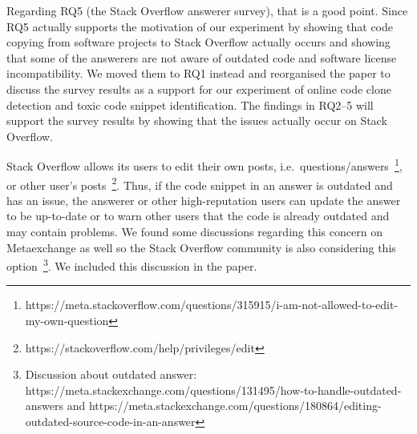 \documentclass[a4paper,twoside,10pt]{reviewresponse}
\begin{document}
Regarding RQ5 (the Stack Overflow answerer survey), that is a good point. Since RQ5 actually supports the motivation of our experiment by showing that code copying from software projects to Stack Overflow actually occurs and showing that some of the answerers are not aware of outdated code and software license incompatibility. We moved them to RQ1 instead and reorganised the paper to discuss the survey results as a support for our experiment of online code clone detection and toxic code snippet identification. The findings in RQ2--5 will support the survey results by showing that the issues actually occur on Stack Overflow.


Stack Overflow allows its users to edit their own posts, i.e.~questions/answers~\footnote{https://meta.stackoverflow.com/questions/315915/i-am-not-allowed-to-edit-my-own-question}, or other user's posts~\footnote{https://stackoverflow.com/help/privileges/edit}. Thus, if the code snippet in an answer is outdated and has an issue, the answerer or other high-reputation users can update the answer to be up-to-date or to warn other users that the code is already outdated and may contain problems. We found some discussions regarding this concern on Metaexchange as well so the Stack Overflow community is also considering this option~\footnote{Discussion about outdated answer: https://meta.stackexchange.com/questions/131495/how-to-handle-outdated-answers and https://meta.stackexchange.com/questions/180864/editing-outdated-source-code-in-an-answer}. We included this discussion in the paper.
\end{document}
